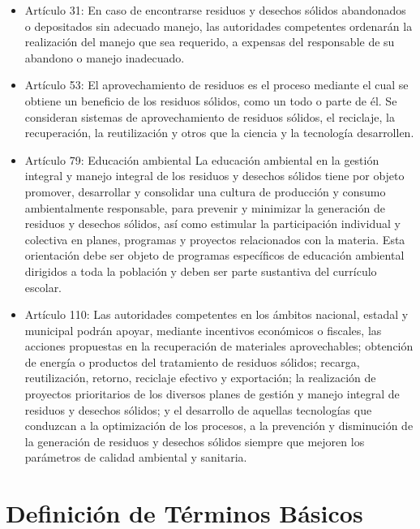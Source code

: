 \begin{itemize}
    \item Artículo 31: En caso de encontrarse residuos y desechos sólidos abandonados o depositados sin adecuado manejo, las autoridades competentes ordenarán la realización del manejo que sea requerido, a expensas del responsable de su abandono o manejo inadecuado.

    \item Artículo 53: El aprovechamiento de residuos es el proceso mediante el cual se obtiene un beneficio de los residuos sólidos, como un todo o parte de él. Se consideran sistemas de aprovechamiento de residuos sólidos, el reciclaje, la recuperación, la reutilización y otros que la ciencia y la tecnología desarrollen.
    
    \item Artículo 79: Educación ambiental La educación ambiental en la gestión integral y manejo integral de los residuos y desechos sólidos tiene por objeto promover, desarrollar y consolidar una cultura de producción y consumo ambientalmente responsable, para prevenir y minimizar la generación de residuos y desechos sólidos, así como estimular la participación individual y colectiva en planes, programas y proyectos relacionados con la materia. Esta orientación debe ser objeto de programas específicos de educación ambiental dirigidos a toda la población y deben ser parte sustantiva del currículo escolar.
    
    \item Artículo 110: Las autoridades competentes en los ámbitos nacional, estadal y municipal podrán apoyar, mediante incentivos económicos o fiscales, las acciones propuestas en la recuperación de materiales aprovechables; obtención de energía o productos del tratamiento de residuos sólidos; recarga, reutilización, retorno, reciclaje efectivo y exportación; la realización de proyectos prioritarios de los diversos planes de gestión y manejo integral de residuos y desechos sólidos; y el desarrollo de aquellas tecnologías que conduzcan a la optimización de los procesos, a la prevención y disminución de la generación de residuos y desechos sólidos siempre que mejoren los parámetros de calidad ambiental y sanitaria.
\end{itemize}

\newpage

\section{Definición de Términos Básicos}

